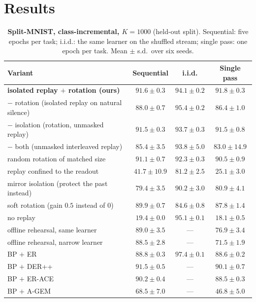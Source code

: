 \documentclass{article}
\begin{document}
\section{Results}
\label{sec:results}

\begin{table}[t]
\centering\footnotesize
\caption{\textbf{Split-MNIST, class-incremental, $K{=}1000$} (held-out split). Sequential:
five epochs per task; i.i.d.: the same learner on the shuffled stream; single pass: one epoch
per task. Mean $\pm$ s.d.\ over six seeds.}
\label{tab:ablation}
\begin{tabular}{@{}lccc@{}}
\toprule
Variant & Sequential & i.i.d. & Single pass \\
\midrule
\textbf{isolated replay $+$ rotation (ours)} & $\mathbf{91.6\pm0.3}$ & $94.1\pm0.2$ & $\mathbf{91.8\pm0.3}$ \\
\quad $-$ rotation (isolated replay on natural silence) & $88.0\pm0.7$ & $95.4\pm0.2$ & $86.4\pm1.0$ \\
\quad $-$ isolation (rotation, unmasked replay) & $91.5\pm0.3$ & $93.7\pm0.3$ & $91.5\pm0.8$ \\
\quad $-$ both (unmasked interleaved replay) & $85.4\pm3.5$ & $93.8\pm5.0$ & $83.0\pm14.9$ \\
\quad random rotation of matched size & $91.1\pm0.7$ & $92.3\pm0.3$ & $90.5\pm0.9$ \\
\quad replay confined to the readout & $41.7\pm10.9$ & $81.2\pm2.5$ & $25.1\pm3.0$ \\
\quad mirror isolation (protect the past instead) & $79.4\pm3.5$ & $90.2\pm3.0$ & $80.9\pm4.1$ \\
\quad soft rotation (gain $0.5$ instead of $0$) & $89.9\pm0.7$ & $84.6\pm0.8$ & $87.8\pm1.4$ \\
\quad no replay & $19.4\pm0.0$ & $95.1\pm0.1$ & $18.1\pm0.5$ \\
\midrule
offline rehearsal, same learner & $89.0\pm3.5$ & --- & $76.9\pm3.4$ \\
offline rehearsal, narrow learner & $88.5\pm2.8$ & --- & $71.5\pm1.9$ \\
\midrule
BP $+$ ER & $88.8\pm0.3$ & $97.4\pm0.1$ & $88.6\pm0.2$ \\
BP $+$ DER++ & $91.5\pm0.5$ & --- & $90.1\pm0.7$ \\
BP $+$ ER-ACE & $90.2\pm0.4$ & --- & $88.5\pm0.3$ \\
BP $+$ A-GEM & $68.5\pm7.0$ & --- & $46.8\pm5.0$ \\
\bottomrule
\end{tabular}
\end{table}
\end{document}
